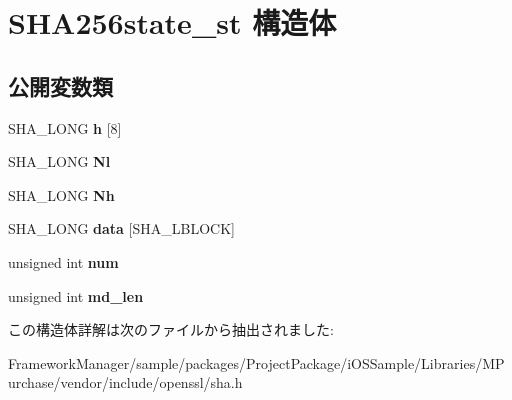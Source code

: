\hypertarget{struct_s_h_a256state__st}{}\section{S\+H\+A256state\+\_\+st 構造体}
\label{struct_s_h_a256state__st}
\subsection*{公開変数類}
\begin{DoxyCompactItemize}
\item 
\hypertarget{struct_s_h_a256state__st_a8a5e81981080254a7aa9ad6e11a4f253}{}S\+H\+A\+\_\+\+L\+O\+N\+G {\bfseries h} \mbox{[}8\mbox{]}\label{struct_s_h_a256state__st_a8a5e81981080254a7aa9ad6e11a4f253}

\item 
\hypertarget{struct_s_h_a256state__st_ac34962074aa1766470fae99d0e2aef9b}{}S\+H\+A\+\_\+\+L\+O\+N\+G {\bfseries Nl}\label{struct_s_h_a256state__st_ac34962074aa1766470fae99d0e2aef9b}

\item 
\hypertarget{struct_s_h_a256state__st_a02ad38687202dc1f21f78925599ec5ca}{}S\+H\+A\+\_\+\+L\+O\+N\+G {\bfseries Nh}\label{struct_s_h_a256state__st_a02ad38687202dc1f21f78925599ec5ca}

\item 
\hypertarget{struct_s_h_a256state__st_a1db17688ebaf2204d126f9232d00d5da}{}S\+H\+A\+\_\+\+L\+O\+N\+G {\bfseries data} \mbox{[}S\+H\+A\+\_\+\+L\+B\+L\+O\+C\+K\mbox{]}\label{struct_s_h_a256state__st_a1db17688ebaf2204d126f9232d00d5da}

\item 
\hypertarget{struct_s_h_a256state__st_a64f6a539f36e85e82781026b68c968cf}{}unsigned int {\bfseries num}\label{struct_s_h_a256state__st_a64f6a539f36e85e82781026b68c968cf}

\item 
\hypertarget{struct_s_h_a256state__st_a8156b1d2d8afc2bd0f0875a943b9f36a}{}unsigned int {\bfseries md\+\_\+len}\label{struct_s_h_a256state__st_a8156b1d2d8afc2bd0f0875a943b9f36a}

\end{DoxyCompactItemize}


この構造体詳解は次のファイルから抽出されました\+:\begin{DoxyCompactItemize}
\item 
Framework\+Manager/sample/packages/\+Project\+Package/i\+O\+S\+Sample/\+Libraries/\+M\+Purchase/vendor/include/openssl/sha.\+h\end{DoxyCompactItemize}
